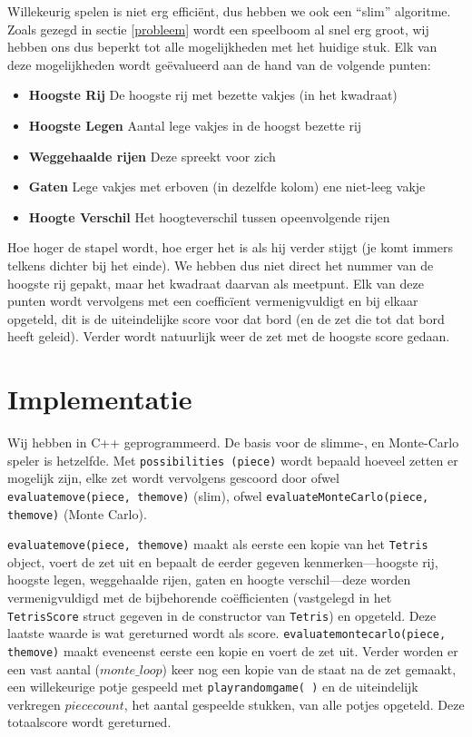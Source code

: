 \documentclass[10pt]{article}
\begin{document}
Willekeurig spelen is niet erg effici\"{e}nt, dus hebben we ook een ``slim'' algoritme. Zoals gezegd in sectie \ref{probleem} wordt een speelboom al snel erg groot, wij hebben ons dus beperkt tot alle mogelijkheden met het huidige stuk. Elk van deze mogelijkheden wordt ge\"{e}valueerd aan de hand van de volgende punten:
\begin{itemize}

\item \textbf{Hoogste Rij} De hoogste rij met bezette vakjes (in het kwadraat)

\item \textbf{Hoogste Legen} Aantal lege vakjes in de hoogst bezette rij

\item \textbf{Weggehaalde rijen} Deze spreekt voor zich

\item \textbf{Gaten} Lege vakjes met erboven (in dezelfde kolom) ene niet-leeg vakje

\item \textbf{Hoogte Verschil} Het hoogteverschil tussen opeenvolgende rijen

\end{itemize}
Hoe hoger de stapel wordt, hoe erger het is als hij verder stijgt (je komt immers telkens dichter bij het einde). We hebben dus niet direct het nummer van de hoogste rij gepakt, maar het kwadraat daarvan als meetpunt. Elk van deze punten wordt vervolgens met een coeffic\"{i}ent vermenigvuldigt en bij elkaar opgeteld, dit is de uiteindelijke score voor dat bord (en de zet die tot dat bord heeft geleid). Verder wordt natuurlijk weer de zet met de hoogste score gedaan.

\section{Implementatie}

Wij hebben in C++ geprogrammeerd. De basis voor de slimme-, en Monte-Carlo speler is hetzelfde. Met \verb+possibilities (piece)+ wordt bepaald hoeveel zetten er mogelijk zijn, elke zet wordt vervolgens gescoord door ofwel \verb+evaluatemove(piece, themove)+ (slim), ofwel \verb+evaluateMonteCarlo(piece, themove)+ (Monte Carlo).

\verb+evaluatemove(piece, themove)+ maakt als eerste een kopie van het \verb+Tetris+ object, voert de zet uit en bepaalt de eerder gegeven kenmerken---hoogste rij, hoogste legen, weggehaalde rijen, gaten en hoogte verschil---deze worden vermenigvuldigd met de bijbehorende co\"{e}fficienten (vastgelegd in het \verb+TetrisScore+ struct gegeven in de constructor van \verb+Tetris+) en opgeteld. Deze laatste waarde is wat gereturned wordt als score.
\verb+evaluatemontecarlo(piece, themove)+ maakt eveneenst eerste een kopie en voert de zet uit. Verder worden er een vast aantal ($monte\_loop$) keer nog een kopie van de staat na de zet gemaakt, een willekeurige potje gespeeld met \verb+playrandomgame( )+ en de uiteindelijk verkregen $piececount$, het aantal gespeelde stukken, van alle potjes opgeteld. Deze totaalscore wordt gereturned.
\end{document}
